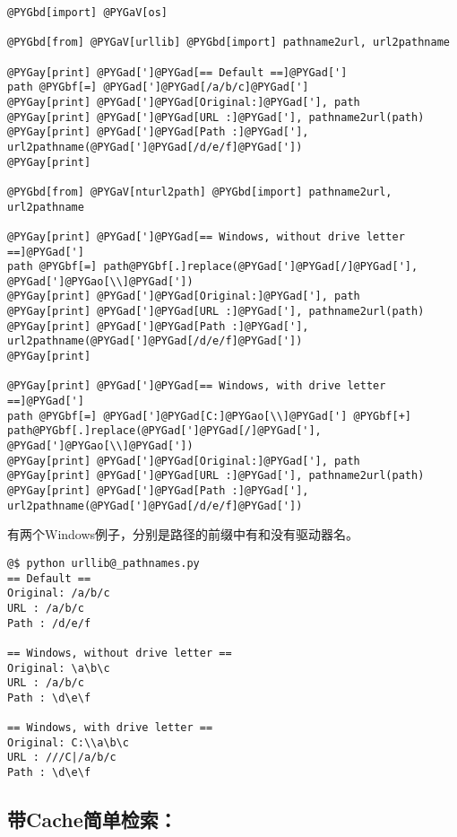 \documentclass[letterpaper,10pt,english]{manual}
\begin{document}
\begin{Verbatim}[commandchars=@\[\]]
@PYGbd[import] @PYGaV[os]

@PYGbd[from] @PYGaV[urllib] @PYGbd[import] pathname2url, url2pathname

@PYGay[print] @PYGad[']@PYGad[== Default ==]@PYGad[']
path @PYGbf[=] @PYGad[']@PYGad[/a/b/c]@PYGad[']
@PYGay[print] @PYGad[']@PYGad[Original:]@PYGad['], path
@PYGay[print] @PYGad[']@PYGad[URL :]@PYGad['], pathname2url(path)
@PYGay[print] @PYGad[']@PYGad[Path :]@PYGad['], url2pathname(@PYGad[']@PYGad[/d/e/f]@PYGad['])
@PYGay[print]

@PYGbd[from] @PYGaV[nturl2path] @PYGbd[import] pathname2url, url2pathname

@PYGay[print] @PYGad[']@PYGad[== Windows, without drive letter ==]@PYGad[']
path @PYGbf[=] path@PYGbf[.]replace(@PYGad[']@PYGad[/]@PYGad['], @PYGad[']@PYGao[\\]@PYGad['])
@PYGay[print] @PYGad[']@PYGad[Original:]@PYGad['], path
@PYGay[print] @PYGad[']@PYGad[URL :]@PYGad['], pathname2url(path)
@PYGay[print] @PYGad[']@PYGad[Path :]@PYGad['], url2pathname(@PYGad[']@PYGad[/d/e/f]@PYGad['])
@PYGay[print]

@PYGay[print] @PYGad[']@PYGad[== Windows, with drive letter ==]@PYGad[']
path @PYGbf[=] @PYGad[']@PYGad[C:]@PYGao[\\]@PYGad['] @PYGbf[+] path@PYGbf[.]replace(@PYGad[']@PYGad[/]@PYGad['], @PYGad[']@PYGao[\\]@PYGad['])
@PYGay[print] @PYGad[']@PYGad[Original:]@PYGad['], path
@PYGay[print] @PYGad[']@PYGad[URL :]@PYGad['], pathname2url(path)
@PYGay[print] @PYGad[']@PYGad[Path :]@PYGad['], url2pathname(@PYGad[']@PYGad[/d/e/f]@PYGad['])
\end{Verbatim}

有两个Windows例子，分别是路径的前缀中有和没有驱动器名。

\begin{Verbatim}[commandchars=@\[\]]
@$ python urllib@_pathnames.py
== Default ==
Original: /a/b/c
URL : /a/b/c
Path : /d/e/f

== Windows, without drive letter ==
Original: \a\b\c
URL : /a/b/c
Path : \d\e\f

== Windows, with drive letter ==
Original: C:\\a\b\c
URL : ///C|/a/b/c
Path : \d\e\f
\end{Verbatim}


\subsection{带Cache简单检索：}
\end{document}
